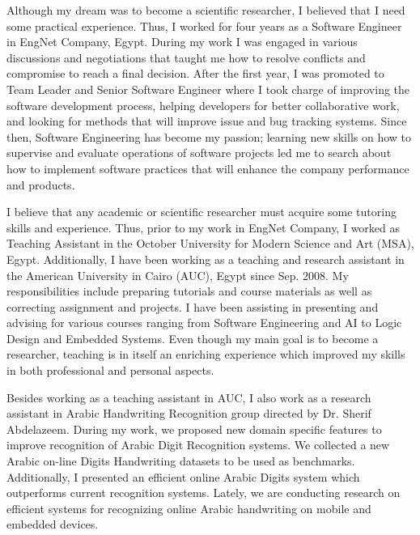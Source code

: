 \documentclass[10pt]{article}%
\begin{document}
 	Although my dream was to become a scientific researcher, I believed that I need some practical experience. Thus, I worked for four years as a Software Engineer in EngNet Company, Egypt. During my work I was engaged in various discussions and negotiations that taught me how to resolve conflicts and compromise to reach a final decision. After the first year, I was promoted to Team Leader and Senior Software Engineer where I took charge of improving the software development process, helping developers for better collaborative work, and looking for methods that will improve issue and bug tracking systems. Since then, Software Engineering has become my passion; learning new skills on how to supervise and evaluate operations of software projects led me to search about how to implement software practices that will enhance the company performance and products.

I believe that any academic or scientific researcher must acquire some tutoring skills and experience. Thus, prior to my work in EngNet Company, I worked as Teaching Assistant in the October University for Modern Science and Art (MSA), Egypt. Additionally, I have been working as a teaching and research assistant in the American University in Cairo (AUC), Egypt since Sep. 2008. My responsibilities include preparing tutorials and course materials as well as correcting assignment and projects. I have been assisting in presenting and advising for various courses ranging from Software Engineering and AI to Logic Design and Embedded Systems. Even though my main goal is to become a researcher, teaching is in itself an enriching experience which improved my skills in both professional and personal aspects.

 
 	Besides working as a teaching assistant in AUC, I also work as a research assistant in Arabic Handwriting Recognition group directed by Dr. Sherif Abdelazeem. During my work, we proposed new domain specific features to improve recognition of Arabic Digit Recognition systems. We collected a new Arabic on-line Digits Handwriting datasets to be used as benchmarks. Additionally, I presented an efficient online Arabic Digits system which outperforms current recognition systems.  Lately, we are conducting research on efficient systems for recognizing online Arabic handwriting on mobile and embedded devices. 
\end{document}
